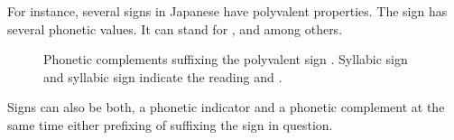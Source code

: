 \documentclass[../main.tex]{subfiles}
\begin{document}
For instance, several signs in Japanese have polyvalent properties.
The sign  has several phonetic values.
It can stand for ,  and  among others.
\begin{figure}[h!]
    \centering
    \caption[Japanese phonetic complements]{Phonetic complements suffixing the
             polyvalent sign .
            Syllabic sign   and 
            syllabic sign   indicate the reading
              and 
             .}
\end{figure}
Signs can also be both, a phonetic indicator and a phonetic complement at the same time either
prefixing of suffixing the sign in question.
\end{document}
